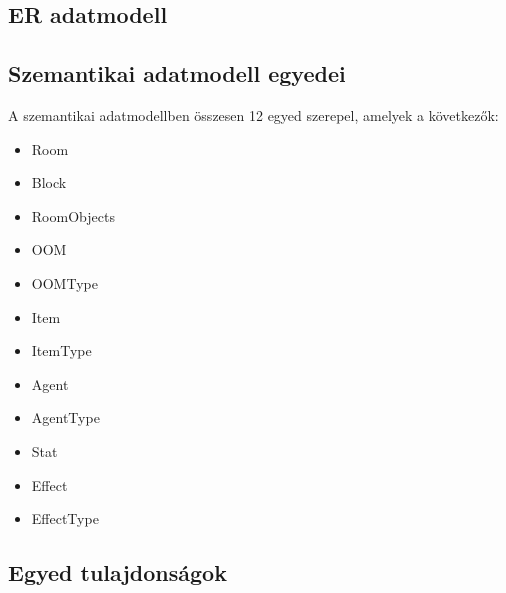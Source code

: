 \subsection{ER adatmodell}


\subsection{Szemantikai adatmodell egyedei}

A szemantikai adatmodellben összesen 12 egyed szerepel, amelyek a következők:

\begin{itemize}
    \item Room
    \item Block
    \item RoomObjects
    \item OOM
    \item OOMType
    \item Item
    \item ItemType
    \item Agent
    \item AgentType
    \item Stat
    \item Effect
    \item EffectType
\end{itemize}

\subsection{Egyed tulajdonságok}

